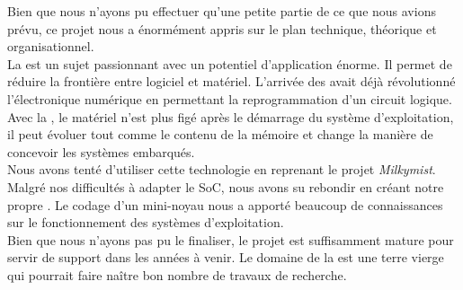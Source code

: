 Bien que nous n'ayons pu effectuer qu'une petite partie de ce que nous avions prévu, ce projet nous a énormément appris sur le plan technique, théorique et organisationnel.\\
La  est un sujet passionnant avec un potentiel d'application énorme. Il permet de réduire la frontière entre logiciel et matériel. L'arrivée des \fpgas{} avait déjà révolutionné l'électronique numérique en permettant la reprogrammation d'un circuit logique. Avec la , le matériel n'est plus figé après le démarrage du système d'exploitation, il peut évoluer tout comme le contenu de la mémoire et change la manière de concevoir les systèmes embarqués.\\
Nous avons tenté d'utiliser cette technologie en reprenant le projet \textit{Milkymist}. Malgré nos difficultés à adapter le SoC, nous avons su rebondir en créant notre propre . Le codage d'un mini-noyau nous a apporté beaucoup de connaissances sur le fonctionnement des systèmes d'exploitation.\\
Bien que nous n'ayons pas pu le finaliser, le projet est suffisamment mature pour servir de support dans les années à venir. Le domaine de la  est une terre vierge qui pourrait faire naître bon nombre de travaux de recherche.

